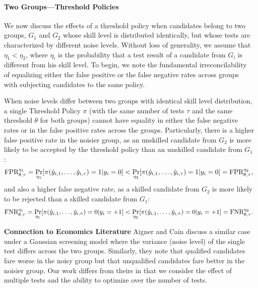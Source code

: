 \paragraph{Two Groups---Threshold Policies}

We now discuss the effects of a threshold policy 
when candidates belong to two groups, $G_1$ and $G_2$ 
whose skill level is distributed identically,
but whose tests are characterized by different noise levels.
Without loss of generality, we assume that $\eta_1<\eta_2$, 
where $\eta_i$ is the probability 
that a test result of a candidate from $G_i$ is different from his skill level.
To begin, we note the fundamental irreconcilability of equalizing either the false positive or the false negative rates across groups with subjecting candidates to the same policy.

\begin{theorem}\label{thm:stochasticDominance}
When noise levels differ between two groups with identical skill level distribution, 
a single Threshold Policy $\pi$ 
(with the same number of tests $\tau$ 
and the same threshold $\theta$ for both groups) 
cannot have equality in either the false negative rates 
or in the false positive rates across the groups. 
Particularly, there is a higher false positive rate in the noisier group, 
as an unskilled candidate from $G_2$ is more likely to be accepted 
by the threshold policy than an unskilled candidate from $G_1$:
\begin{equation*}
\textnormal{FPR}_{\theta,\tau}^{\eta_1}=
\Pr_{\eta_1}[\pi(\hat{y}_{i,1},\dots,\hat{y}_{i,\tau})=1|y_i=0]<\Pr_{\eta_2}[\pi(\hat{y}_{i,1},\dots,\hat{y}_{i,\tau})=1|y_i=0]
=\textnormal{FPR}_{\theta,\tau}^{\eta_2},
\end{equation*}
and also a higher false negative rate, 
as a skilled candidate from $G_2$ is more likely to be rejected 
than a skilled candidate from $G_1$:
\begin{equation*}
\textnormal{FNR}_{\theta,\tau}^{\eta_1}=
\Pr_{\eta_1}[\pi(\hat{y}_{i,1},\dots,\hat{y}_{i,\tau})=0|y_i=+1]<\Pr_{\eta_2}[\pi(\hat{y}_{i,1},\dots,\hat{y}_{i,\tau})=0|y_i=+1]=\text{FNR}_{\theta,\tau}^{\eta_2}.
\end{equation*}
\end{theorem}
\textbf{Connection to Economics Literature }%
 Aigner and Cain \cite{aigner1977statistical} discuss 
a similar case under a Gaussian screening model
where the variance (noise level) of the single test
differs across the two groups. 
Similarly, they note that qualified candidates fare worse in the noisy group
but that unqualified candidates fare better in the noisier group.
Our work differs from theirs in that 
we consider the effect of multiple tests
and the ability to optimize over the number of tests.

